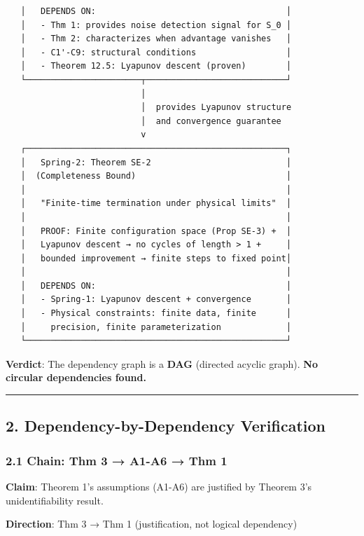 \documentclass[
  12pt,
]{ctexart}
\begin{document}
\begin{verbatim}
   │   DEPENDS ON:                                      │
   │   - Thm 1: provides noise detection signal for S_0 │
   │   - Thm 2: characterizes when advantage vanishes   │
   │   - C1'-C9: structural conditions                  │
   │   - Theorem 12.5: Lyapunov descent (proven)        │
   └───────────────────────┬────────────────────────────┘
                           │
                           │  provides Lyapunov structure
                           │  and convergence guarantee
                           v
   ┌────────────────────────────────────────────────────┐
   │   Spring-2: Theorem SE-2                           │
   │  (Completeness Bound)                              │
   │                                                    │
   │   "Finite-time termination under physical limits"  │
   │                                                    │
   │   PROOF: Finite configuration space (Prop SE-3) +  │
   │   Lyapunov descent → no cycles of length > 1 +     │
   │   bounded improvement → finite steps to fixed point│
   │                                                    │
   │   DEPENDS ON:                                      │
   │   - Spring-1: Lyapunov descent + convergence       │
   │   - Physical constraints: finite data, finite      │
   │     precision, finite parameterization             │
   └────────────────────────────────────────────────────┘
\end{verbatim}

\textbf{Verdict}: The dependency graph is a \textbf{DAG} (directed
acyclic graph). \textbf{No circular dependencies found.}

\begin{center}\rule{0.5\linewidth}{0.5pt}\end{center}

\subsection{2. Dependency-by-Dependency
Verification}\label{dependency-by-dependency-verification}

\subsubsection{2.1 Chain: Thm 3 → A1-A6 → Thm
1}\label{chain-thm-3-a1-a6-thm-1}

\textbf{Claim}: Theorem 1's assumptions (A1-A6) are justified by Theorem
3's unidentifiability result.

\textbf{Direction}: Thm 3 → Thm 1 (justification, not logical
dependency)
\end{document}
